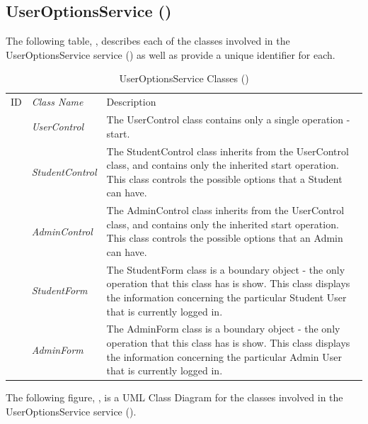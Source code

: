 \documentclass[12pt,letterpaper]{article}
\begin{document}
\subsection{UserOptionsService ()}

The following table, , describes each of the classes involved in the UserOptionsService service () as well as provide a unique identifier for each.
\begin{table}[H]
	\caption{UserOptionsService Classes ()} 
	\begin{tabu} to 
	    \tableheader{}ID & Class Name & Description \\
	     & UserControl & The UserControl class contains only a single operation - start.\\
	     & StudentControl & The StudentControl class inherits from the UserControl class, and contains only the inherited start operation. This class controls the possible options that a Student can have.\\
	     & AdminControl & The AdminControl class inherits from the UserControl class, and contains only the inherited start operation. This class controls the possible options that an Admin can have. \\
	     & StudentForm & The StudentForm class is a boundary object - the only operation that this class has is show. This class displays the information concerning the particular Student User that is currently logged in.\\
	     & AdminForm & The AdminForm class is a boundary object - the only operation that this class has is show. This class displays the information concerning the particular Admin User that is currently logged in.\\
	\end{tabu}
\end{table}

The following figure, , is a UML Class Diagram for the classes involved in the UserOptionsService service ().
\end{document}
